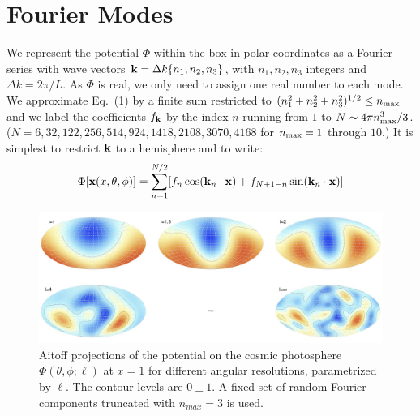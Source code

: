 \documentclass[12pt]{article}
\begin{document}
\section{Fourier Modes}
We represent the potential $\Phi$ within the box in polar coordinates as a Fourier series with wave vectors ${\bf k}=\Delta k\{n_1,n_2,n_3\}$, with $n_1,n_2,n_3$ integers and $\Delta k=2\pi/L$. As $\Phi$ is real, we only need to assign one real number to each mode. We approximate Eq.~(1) by a finite sum restricted to $(n_1^2+n_2^2+n_3^2)^{1/2}\le n_{\rm max}$ and we label the coefficients $f_{\bf k}$ by the index $n$ running from $1$ to $N\sim4\pi n_{\rm max}^3/3$. ($N=6,32,122, 256,514,924,1418,2108,3070,4168$ for $n_{\rm max}=1$ through $10$.) It is simplest to restrict ${\bf k}$ to a hemisphere and to write:
\begin{equation}
\Phi[{\bf x}(x,\theta,\phi)]=\sum_{n=1}^{N/2}[f_n\cos({\bf k}_n\cdot{\bf x})+f_{N+1-n}\sin({\bf k}_n\cdot{\bf x})]
\end{equation}
\begin{figure}[h!]
\centering
\includegraphics[width=6in]{fig1.jpg}
\caption{Aitoff projections of the potential on the cosmic photosphere $\Phi(\theta,\phi;\ell)$ at $x=1$ for different angular resolutions, parametrized by $\ell$. The contour levels are $0\pm1$. A fixed set of random Fourier components truncated with $n_{max}=3$ is used.}
\end{figure}
\end{document}
